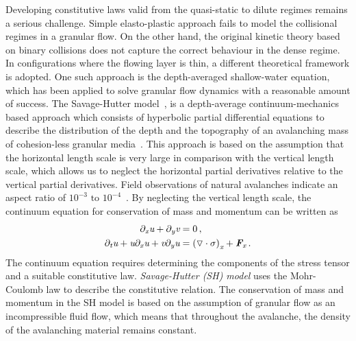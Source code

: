 Developing constitutive laws valid from the quasi-static to
dilute regimes remains a serious challenge. Simple 
elasto-plastic approach fails to model the collisional regimes in a granular 
flow. On the other hand, the original kinetic theory based 
on binary collisions does not capture the correct behaviour in the dense regime.
In configurations where the flowing layer is thin, a different theoretical 
framework is adopted.
%
One such approach is the depth-averaged shallow-water equation, which has been 
applied to solve granular flow dynamics with a reasonable amount of success. 
The Savage-Hutter model~\citep{Savage1991}, is a depth-average 
continuum-mechanics based approach which consists of hyperbolic partial 
differential equations to 
describe the distribution of the depth and the topography of an avalanching 
mass of cohesion-less granular media~\citep{Hutter2005}. This approach is based 
on the assumption that the horizontal length scale is very large in comparison 
with the vertical length scale, which allows us to neglect the horizontal 
partial derivatives relative to the vertical partial derivatives. Field 
observations of natural avalanches indicate an aspect ratio of $10^{-3} \mbox{ 
to } 10^{-4}$~\citep{Cawthor2006a}. By neglecting the vertical length 
scale, the continuum equation for conservation of mass and momentum can be 
written as
%
\begin{align}
 \partial_{\textit{x}}\textit{u}+\partial_{\textit{y}}\textit{v}& =0 \,,\\
 \partial_{\textit{t}}\textit{u}+\textit{u}\partial_{\textit{x}}\textit{u} + 
\textit{v}\partial_{\textit{y}}\textit{u} & =\left(\triangledown \cdot \sigma 
\right)_{\textit{x}} +\textit{\textbf{F}}_{\textit{x}} \,.
\end{align}
%
The continuum equation requires determining the components of the stress tensor 
and a suitable constitutive law. \textit{Savage-Hutter (SH) model} uses the 
Mohr-Coulomb law to describe the constitutive relation. The conservation of 
mass and momentum in the SH model is based on the assumption of granular flow 
as an incompressible fluid flow, which means that throughout the avalanche, the 
density of the avalanching material remains constant. 
